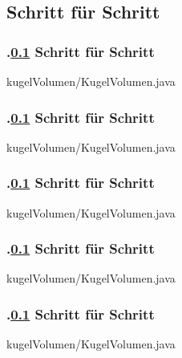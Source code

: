 \def\stitle{Schritt f\"ur Schritt}%
\subsection{\stitle}\label{S:SchrittSchritt}
\begin{frame}[t]%
  \frametitle{\kap.\ref{S:SchrittSchritt} \stitle}%
\medskip


{kugelVolumen/KugelVolumen.java}

\end{frame}


\def\stitle{Schritt f\"ur Schritt}%
\begin{frame}[t]%
  \frametitle{\kap.\ref{S:SchrittSchritt} \stitle}%
\medskip


{kugelVolumen/KugelVolumen.java}

\end{frame}


\def\stitle{Schritt f\"ur Schritt}%
\begin{frame}[t]%
  \frametitle{\kap.\ref{S:SchrittSchritt} \stitle}%
\medskip


{kugelVolumen/KugelVolumen.java}

\end{frame}


\def\stitle{Schritt f\"ur Schritt}%
\begin{frame}[t]%
  \frametitle{\kap.\ref{S:SchrittSchritt} \stitle}%
\medskip


{kugelVolumen/KugelVolumen.java}

\end{frame}


\def\stitle{Schritt f\"ur Schritt}%
\begin{frame}[t]%
  \frametitle{\kap.\ref{S:SchrittSchritt} \stitle}%
\medskip


{kugelVolumen/KugelVolumen.java}

\end{frame}



